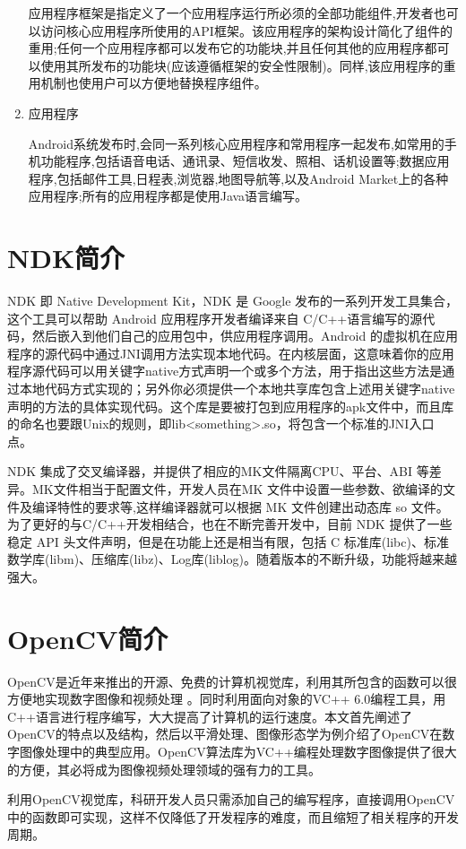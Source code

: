 \documentclass{XDBAthesis}
\begin{document}
\begin{enumerate}
 应用程序框架是指定义了一个应用程序运行所必须的全部功能组件,开发者也可以访问核心应用程序所使用的API框架。该应用程序的架构设计简化了组件的重用;任何一个应用程序都可以发布它的功能块,并且任何其他的应用程序都可以使用其所发布的功能块(应该遵循框架的安全性限制)。同样,该应用程序的重用机制也使用户可以方便地替换程序组件。
    \item 应用程序 

    Android系统发布时,会同一系列核心应用程序和常用程序一起发布,如常用的手机功能程序,包括语音电话、通讯录、短信收发、照相、话机设置等;数据应用程序,包括邮件工具,日程表,浏览器,地图导航等,以及Android Market上的各种应用程序;所有的应用程序都是使用Java语言编写。 
    
\end{enumerate}


\section{NDK简介}

   NDK 即 Native Development Kit，NDK 是 Google 发布的一系列开发工具集合，这个工具可以帮助 Android 应用程序开发者编译来自 C/C++语言编写的源代码，然后嵌入到他们自己的应用包中，供应用程序调用。Android 的虚拟机在应用程序的源代码中通过JNI调用方法实现本地代码。在内核层面，这意味着你的应用程序源代码可以用关键字native方式声明一个或多个方法，用于指出这些方法是通过本地代码方式实现的；另外你必须提供一个本地共享库包含上述用关键字native声明的方法的具体实现代码。这个库是要被打包到应用程序的apk文件中，而且库的命名也要跟Unix的规则，即lib<something>.so，将包含一个标准的JNI入口点。

   NDK 集成了交叉编译器，并提供了相应的MK文件隔离CPU、平台、ABI 等差异。MK文件相当于配置文件，开发人员在MK 文件中设置一些参数、欲编译的文件及编译特性的要求等,这样编译器就可以根据 MK 文件创建出动态库 so 文件。为了更好的与C/C++开发相结合，也在不断完善开发中，目前 NDK 提供了一些稳定 API 头文件声明，但是在功能上还是相当有限，包括 C 标准库(libc)、标准数学库(libm)、压缩库(libz)、Log库(liblog)。随着版本的不断升级，功能将越来越强大。

\section{OpenCV简介}

OpenCV是近年来推出的开源、免费的计算机视觉库，利用其所包含的函数可以很方便地实现数字图像和视频处理\cite{秦小文2011基于} 。同时利用面向对象的VC++ 6.0编程工具，用C++语言进行程序编写，大大提高了计算机的运行速度。本文首先阐述了OpenCV的特点以及结构，然后以平滑处理、图像形态学为例介绍了OpenCV在数字图像处理中的典型应用。OpenCV算法库为VC++编程处理数字图像提供了很大的方便，其必将成为图像视频处理领域的强有力的工具。

利用OpenCV视觉库，科研开发人员只需添加自己的编写程序，直接调用OpenCV中的函数即可实现，这样不仅降低了开发程序的难度，而且缩短了相关程序的开发周期。


\ifx\allfiles\undefined
%

\end{document}
